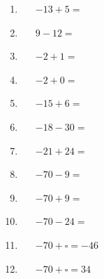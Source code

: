 \documentclass[a4paper,12pt]{article}
\begin{document}
\begin{onehalfspace}
\begin{tcolorbox}[colback=red!0!white, colframe=gray ,title=\subsubsection{Use a number line (when you need to), to help you work out the following sums.}\label{IntThree}]
\begin{multicols}{3}
\begin{enumerate}[label=\footnotesize \roman*)]
		\item~~~$-13+5=$
		\item~~~$9-12=$
		\item~~~$-2+1=$
		\item~~~$-2+0=$
		\item~~~$-15+6=$
		\item~~~$-18-30=$
		\item~~~$-21+24=$
		\item~~~$-70-9=$
		\item~~~$-70+9=$
		\item~~~$-70-24=$
		\item~~~$-70+\square=-46$
		\item~~~$-70+\square=34$
	\end{enumerate}
\end{multicols}
\end{tcolorbox}





\newpage		

\end{onehalfspace}
\end{document}

